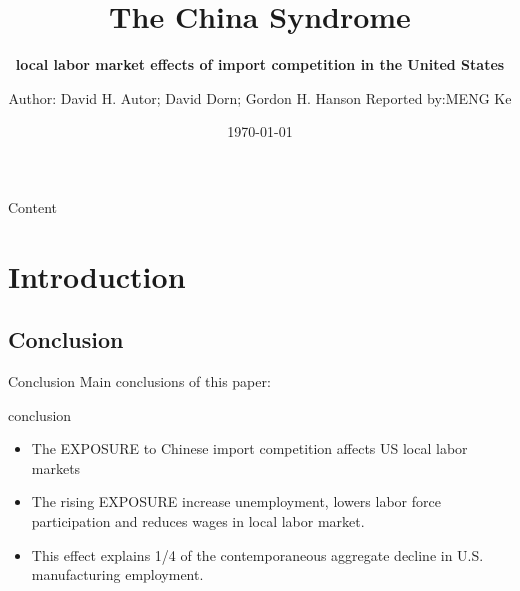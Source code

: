 \documentclass[10pt,aspectratio=43,mathserif,table]{beamer}
\title{The China Syndrome}
\subtitle{\fontsize{9pt}{14pt}\textbf{local labor market effects of import competition in the United States}}
\author{Author: David H. Autor; David Dorn; Gordon H. Hanson \newline \newline Reported by:MENG Ke }
\institute{\fontsize{8pt}{14pt}China Institute for WTO Studies, UIBE}
\date{\today}
\begin{document}

\frame{\titlepage}

\section[Content]{}   %
\begin{frame}{Content}
\tableofcontents
\end{frame}

\section{Introduction}  %
\subsection{Conclusion}
\begin{frame}{Conclusion}
	Main conclusions of this paper:
	\begin{block}{conclusion}
		\begin{itemize}
			\item<0->  The EXPOSURE to Chinese import competition affects US local labor markets
			\item<0->  The rising EXPOSURE increase unemployment, lowers labor force participation and reduces wages in local labor market.
			\item<0->  This effect explains 1/4 of the contemporaneous aggregate decline in U.S. manufacturing employment.
		\end{itemize}
	\end{block}
\end{frame}
\end{document}
